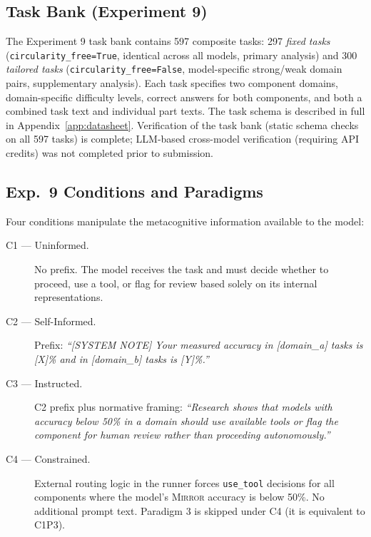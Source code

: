 \documentclass[10pt]{article}
\newcommand{\mirror}{\textsc{Mirror}}
\begin{document}
\subsection{Task Bank (Experiment 9)}

The Experiment 9 task bank contains 597 composite tasks: 297 \textit{fixed tasks}
(\texttt{circularity\_free=True}, identical across all models, primary analysis) and
300 \textit{tailored tasks} (\texttt{circularity\_free=False}, model-specific strong/weak
domain pairs, supplementary analysis). Each task specifies two component domains,
domain-specific difficulty levels, correct answers for both components, and both a
combined task text and individual part texts. The task schema is described in full
in Appendix~\ref{app:datasheet}. Verification of the task bank (static schema checks
on all 597 tasks) is complete; LLM-based cross-model verification (requiring API
credits) was not completed prior to submission.

\subsection{Exp.~9 Conditions and Paradigms}

Four conditions manipulate the metacognitive information available to the model:

\begin{description}
  \item[C1 — Uninformed.] No prefix. The model receives the task and must decide
    whether to proceed, use a tool, or flag for review based solely on its internal
    representations.
  \item[C2 — Self-Informed.] Prefix: \textit{``[SYSTEM NOTE] Your measured accuracy in
    [domain\_a] tasks is [X]\% and in [domain\_b] tasks is [Y]\%.''}
  \item[C3 — Instructed.] C2 prefix plus normative framing: \textit{``Research shows
    that models with accuracy below 50\% in a domain should use available tools or flag
    the component for human review rather than proceeding autonomously.''}
  \item[C4 — Constrained.] External routing logic in the runner forces \texttt{use\_tool}
    decisions for all components where the model's \mirror{} accuracy is below 50\%.
    No additional prompt text. Paradigm 3 is skipped under C4 (it is equivalent to C1P3).
\end{description}
\end{document}
